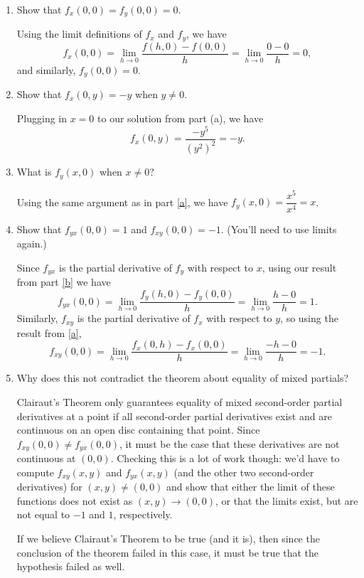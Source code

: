 \documentclass[letterpaper,12pt]{article}
\begin{document}
\begin{enumerate}
\begin{enumerate}
 \item Show that $f_x(0,0)=f_y(0,0)=0$.
 
 \bigskip
 
 Using the limit definitions of $f_x$ and $f_y$, we have
\[
 f_x(0,0)  = \lim_{h\to 0}\frac{f(h,0)-f(0,0)}{h} = \lim_{h\to 0}\frac{0-0}{h}=0,
\]
and similarly, $f_y(0,0)=0$.

 \item Show that $f_x(0,y)=-y$ when $y\neq 0$. \label{a}
 
 \bigskip
 
 Plugging in $x=0$ to our solution from part (a), we have
 \[
 f_x(0,y) = \frac{-y^5}{(y^2)^2} = -y.
 \]
 
 \item What is $f_y(x,0)$ when $x\neq 0$? \label{b}
 
 \bigskip
 
 Using the same argument as in part \ref{a}, we have $f_y(x,0) = \dfrac{x^5}{x^4}=x$.
 
 \item Show that $f_{yx}(0,0)=1$ and $f_{xy}(0,0)=-1$. (You'll need to use limits again.)
 
 \bigskip
 
 Since $f_{yx}$ is the partial derivative of $f_y$ with respect to $x$, using our result from part \ref{b} we have
 \[
 f_{yx}(0,0) = \lim_{h\to 0}\frac{f_y(h,0)-f_y(0,0)}{h} = \lim_{h\to 0}\frac{h-0}{h} = 1.
 \]
 Similarly, $f_{xy}$ is the partial derivative of $f_x$ with respect to $y$, so using the result from \ref{a},
 \[
 f_{xy}(0,0) = \lim_{h\to 0}\frac{f_x(0,h)-f_x(0,0)}{h} = \lim_{h\to 0}\frac{-h-0}{h} = -1.
 \]
 
 \item Why does this not contradict the theorem about equality of mixed partials?
 
 \bigskip
 
 Clairaut's Theorem only guarantees equality of mixed second-order partial derivatives at a point if all second-order partial derivatives exist and are continuous on an open disc containing that point. Since $f_{xy}(0,0)\neq f_{yx}(0,0)$, it must be the case that these derivatives are not continuous at $(0,0)$. Checking this is a lot of work though: we'd have to compute $f_{xy}(x,y)$ and $f_{yx}(x,y)$ (and the other two second-order derivatives) for $(x,y)\neq (0,0)$ and show that either the limit of these functions does not exist as $(x,y)\to (0,0)$, or that the limits exist, but are not equal to $-1$ and $1$, respectively.
 
 If we believe Clairaut's Theorem to be true (and it is), then since the conclusion of the theorem failed in this case, it must be true that the hypothesis failed as well.
\end{enumerate}

 \end{enumerate}
\end{document}
